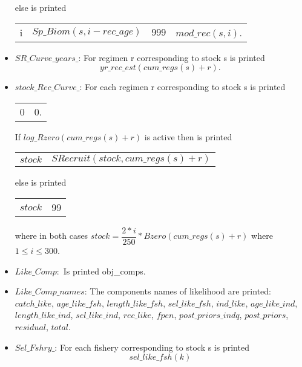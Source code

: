 \documentclass{article}
\begin{document}
\begin{itemize}
\begin{center}
\begin{tabular}{c c c c}
    \end{tabular}
    
\end{center}
else is printed
\begin{center}
    \begin{tabular}{c c c c}
     i    & $Sp\_Biom(s,i-rec\_age)$ & $999$ & $mod\_rec(s,i)$. \\

    \end{tabular}
\end{center}
\item $SR\_Curve\_years\_$: For regimen r corresponding to stock s is printed
\begin{equation}
    yr\_rec\_est(cum\_regs(s)+r).
\end{equation}

\item $stock\_Rec\_Curve\_$: For each regimen r corresponding to stock s is printed
\begin{center}
    \begin{tabular}{c c}
        0 & 0. \end{tabular}
\end{center}
If $log\_Rzero(cum\_regs(s)+r)$ is active then is printed
\begin{center}
    \begin{tabular}{c c}
        $stock$ &  $SRecruit(stock, cum\_regs(s)+r)$ \end{tabular}
\end{center}
else is printed

\begin{center}
    \begin{tabular}{c c}
        $stock$ &  99 \\

    \end{tabular}
\end{center}
where in both cases $stock=\dfrac{2*i}{250}*Bzero(cum\_regs(s)+r)$ where $1\leq i \leq 300$.
\item $Like\_Comp:$ Is printed obj\_comps.
\item $Like\_Comp\_names$: The components names of likelihood are printed: $catch\_like$, $age\_like\_fsh$,  $length\_like\_fsh$, $sel\_like\_fsh$, $ind\_like $, $age\_like\_ind$, $length\_like\_ind$, $sel\_like\_ind$, $rec\_like$, $fpen$, $post\_priors\_indq$, $post\_priors$, $residual$, $total$.

\item $Sel\_Fshry\_$: For each fishery corresponding to stock s is printed
\begin{equation}
    sel\_like\_fsh(k)
\end{equation}


\end{itemize}
\end{document}
